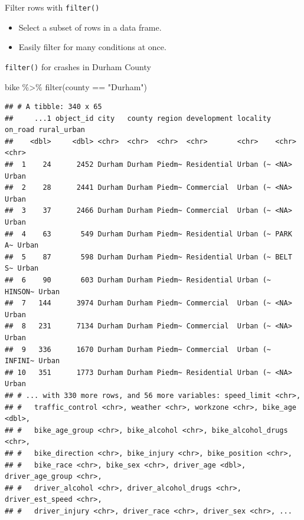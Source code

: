\documentclass[
  ignorenonframetext,
]{beamer}
\newenvironment{Shaded}{\begin{snugshade}}{\end{snugshade}}
\newcommand{\FunctionTok}[1]{\textcolor[rgb]{0.00,0.00,0.00}{#1}}
\newcommand{\NormalTok}[1]{#1}
\newcommand{\SpecialCharTok}[1]{\textcolor[rgb]{0.00,0.00,0.00}{#1}}
\newcommand{\StringTok}[1]{\textcolor[rgb]{0.31,0.60,0.02}{#1}}
\providecommand{\tightlist}{%
  \setlength{\itemsep}{0pt}\setlength{\parskip}{0pt}}
\begin{document}
\begin{frame}{Filter rows with \texttt{filter()}}
\protect\hypertarget{filter-rows-with-filter}{}
\begin{itemize}
\tightlist
\item
  Select a subset of rows in a data frame.
\item
  Easily filter for many conditions at once.
\end{itemize}
\end{frame}

\begin{frame}[fragile]{\texttt{filter()}}
\protect\hypertarget{filter}{}
for crashes in Durham County

\begin{Shaded}
\begin{Highlighting}[]
\NormalTok{bike }\SpecialCharTok{\%\textgreater{}\%}
  \FunctionTok{filter}\NormalTok{(county }\SpecialCharTok{==} \StringTok{"Durham"}\NormalTok{)}
\end{Highlighting}
\end{Shaded}

\begin{verbatim}
## # A tibble: 340 x 65
##     ...1 object_id city   county region development locality on_road rural_urban
##    <dbl>     <dbl> <chr>  <chr>  <chr>  <chr>       <chr>    <chr>   <chr>      
##  1    24      2452 Durham Durham Piedm~ Residential Urban (~ <NA>    Urban      
##  2    28      2441 Durham Durham Piedm~ Commercial  Urban (~ <NA>    Urban      
##  3    37      2466 Durham Durham Piedm~ Commercial  Urban (~ <NA>    Urban      
##  4    63       549 Durham Durham Piedm~ Residential Urban (~ PARK A~ Urban      
##  5    87       598 Durham Durham Piedm~ Residential Urban (~ BELT S~ Urban      
##  6    90       603 Durham Durham Piedm~ Residential Urban (~ HINSON~ Urban      
##  7   144      3974 Durham Durham Piedm~ Commercial  Urban (~ <NA>    Urban      
##  8   231      7134 Durham Durham Piedm~ Commercial  Urban (~ <NA>    Urban      
##  9   336      1670 Durham Durham Piedm~ Commercial  Urban (~ INFINI~ Urban      
## 10   351      1773 Durham Durham Piedm~ Residential Urban (~ <NA>    Urban      
## # ... with 330 more rows, and 56 more variables: speed_limit <chr>,
## #   traffic_control <chr>, weather <chr>, workzone <chr>, bike_age <dbl>,
## #   bike_age_group <chr>, bike_alcohol <chr>, bike_alcohol_drugs <chr>,
## #   bike_direction <chr>, bike_injury <chr>, bike_position <chr>,
## #   bike_race <chr>, bike_sex <chr>, driver_age <dbl>, driver_age_group <chr>,
## #   driver_alcohol <chr>, driver_alcohol_drugs <chr>, driver_est_speed <chr>,
## #   driver_injury <chr>, driver_race <chr>, driver_sex <chr>, ...
\end{verbatim}
\end{frame}
\end{document}
